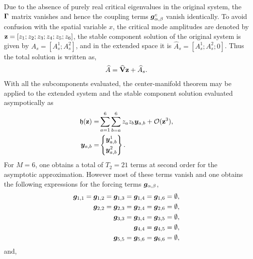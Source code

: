 Due to the absence of purely real critical eigenvalues in the original system, the $\mathbf{\Gamma}$ matrix vanishes and hence the coupling terms $\boldsymbol{g}^{c}_{\alpha,\beta}$ vanish identically. 
To avoid confusion with the spatial variable $x$, the critical mode amplitudes are denoted by $\mathbf{z} = [z_{1};z_{2};z_{3};z_{4};z_{5};z_{6}]$, the stable component solution of the original system is given by $A_{s} = [A^{1}_{s}; A^{2}_{s}]$, and in the extended space it is $\widehat{A}_{s} = [A^{1}_{s}; A^{2}_{s}; 0]$. Thus the total solution is written as,
\begin{eqnarray}
	\widehat{A} = \widehat{\mathbf{V}}\mathbf{z} + \widehat{A}_{s}. \nonumber
\end{eqnarray}
With all the subcomponents evaluated, the center-manifold theorem may be applied to the extended system and the stable component solution evaluated asympotically as
\begin{align}
	\label{eqn:GL_asymptotic}
		\mathfrak{h}(\mathbf{z}) =& \sum_{a=1}^{6}\sum_{b=a}^{6} z_{a}z_{b}\vfield{y}_{a,b}
		 + \mathcal{O}(\mathbf{z}^{3}), \nonumber \\
		 \vfield{y}_{a,b} =& \begin{Bmatrix}
		 	\vfield{y}^{1}_{a,b} \vspace{1mm} \\
		 	\vfield{y}^{2}_{a,b}
		 \end{Bmatrix}.	\nonumber
\end{align}
For $M=6$, one obtains a total of $T_{2}=21$ terms at second order for the asymptotic approximation. However most of these terms vanish and one obtains the following expressions for the forcing terms $\boldsymbol{g}_{\alpha,\beta}$,
\begin{align}
	\boldsymbol{g}_{1,1}  = \boldsymbol{g}_{1,2} = \boldsymbol{g}_{1,3}  = \boldsymbol{g}_{1,4} = \boldsymbol{g}_{1,6} = \emptyset, \nonumber \\
	\boldsymbol{g}_{2,2} = \boldsymbol{g}_{2,3} = \boldsymbol{g}_{2,4} = \boldsymbol{g}_{2,6} = \emptyset, \nonumber \\
	\boldsymbol{g}_{3,3} = \boldsymbol{g}_{3,4} = \boldsymbol{g}_{3,5} = \emptyset, \nonumber \\
	\boldsymbol{g}_{4,4} = \boldsymbol{g}_{4,5} = \emptyset, \nonumber \\
	\boldsymbol{g}_{5,5} = \boldsymbol{g}_{5,6} = \boldsymbol{g}_{6,6} = \emptyset, \nonumber
\end{align}
and,
